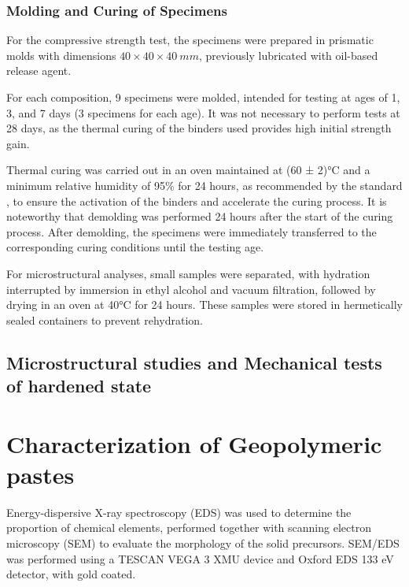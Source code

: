 \subsubsection{Molding and Curing of Specimens}
\label{sec:molding_and_curing_specimens}

For the compressive strength test, the specimens were prepared in prismatic molds with dimensions $40 \times 40 \times 40 \ mm$, previously lubricated with oil-based release agent.

For each composition, 9 specimens were molded, intended for testing at ages of 1, 3, and 7 days (3 specimens for each age). It was not necessary to perform tests at 28 days, as the thermal curing of the binders used provides high initial strength gain.

Thermal curing was carried out in an oven maintained at (60 ± 2)°C and a minimum relative humidity of 95\% for 24 hours, as recommended by the standard \cite{ABNT_NBR_9479_2006}, to ensure the activation of the binders and accelerate the curing process.
It is noteworthy that demolding was performed 24 hours after the start of the curing process. After demolding, the specimens were immediately transferred to the corresponding curing conditions until the testing age.

For microstructural analyses, small samples were separated, with hydration interrupted by immersion in ethyl alcohol and vacuum filtration, followed by drying in an oven at 40°C for 24 hours.
These samples were stored in hermetically sealed containers to prevent rehydration.

\subsection{Microstructural studies and Mechanical tests of hardened state}
\label{sec:microstructural_studies_mechanical_tests_hardened_state}

\section{Characterization of Geopolymeric pastes}
\label{sec:characterization_geopolymeric_pastes}

Energy-dispersive X-ray spectroscopy (EDS) was used to determine the proportion of chemical elements, performed together with scanning electron microscopy (SEM) to evaluate the morphology of the solid precursors.
SEM/EDS was performed using a TESCAN VEGA 3 XMU device and Oxford EDS 133 eV detector, with gold coated.

